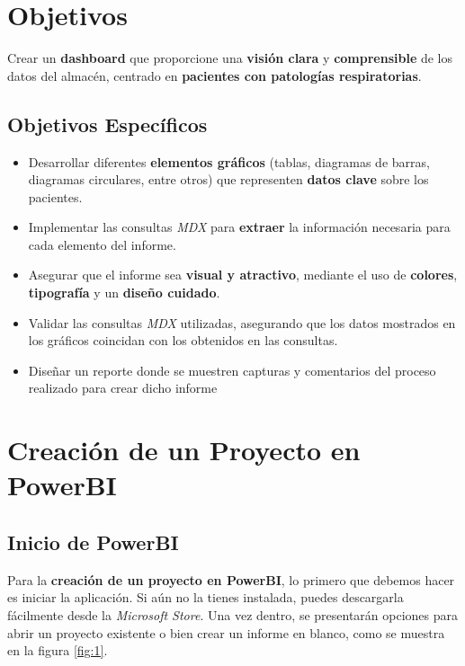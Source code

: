 \documentclass[12pt, a4paper, twoside]{article}
\begin{document}
	\section{Objetivos}
	
	Crear un \textbf{dashboard} que proporcione una \textbf{visión clara} y \textbf{comprensible} de los datos del almacén, centrado en \textbf{pacientes con patologías respiratorias}. 
	
	\subsection{Objetivos Específicos}
	
	\begin{itemize}
		\item Desarrollar diferentes \textbf{elementos gráficos} (tablas, diagramas de barras, diagramas circulares, entre otros) que representen \textbf{datos clave} sobre los pacientes.
		\item Implementar las consultas \textit{MDX} para \textbf{extraer} la información necesaria para cada elemento del informe.
		\item Asegurar que el informe sea \textbf{visual y atractivo}, mediante el uso de \textbf{colores}, \textbf{tipografía} y un \textbf{diseño cuidado}.
		\item Validar las consultas \textit{MDX} utilizadas, asegurando que los datos mostrados en los gráficos coincidan con los obtenidos en las consultas.
		\item Diseñar un reporte donde se muestren capturas y comentarios del proceso realizado para crear dicho informe
	\end{itemize}

	
	\section{\textbf{Creación de un Proyecto en PowerBI}}
	
	\subsection{\textbf{Inicio de PowerBI}}
	
	Para la \textbf{creación de un proyecto en PowerBI}, lo primero que debemos hacer es iniciar la aplicación. Si aún no la tienes instalada, puedes descargarla fácilmente desde la \textit{Microsoft Store}. Una vez dentro, se presentarán opciones para abrir un proyecto existente o bien crear un informe en blanco, como se muestra en la figura \ref{fig:1}.
	
\end{document}
